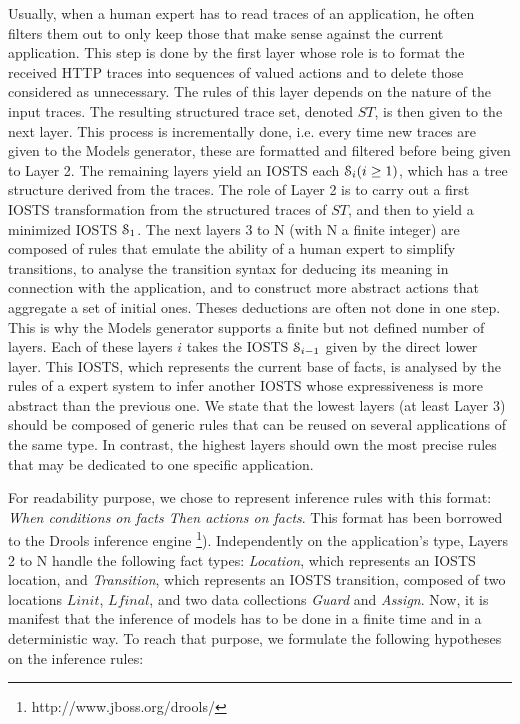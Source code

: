 Usually, when a human expert has to read traces of an
application, he often filters them out to only keep those that
make sense against the current application. This step is done by
the first layer whose role is to format the received HTTP traces
into sequences of valued actions and to delete those considered
as unnecessary. The rules of this layer depends on the nature of
the input traces. The resulting structured trace set, denoted
$ST$, is then given to the next layer. This process is
incrementally done, i.e. every time new traces are given to the
Models generator, these are formatted and filtered before being
given to Layer 2. The remaining layers yield an IOSTS each
$\EuScript{S}_i (i\geq 1)$, which has a tree structure derived
from the traces. The role of Layer 2 is to carry out a first
IOSTS transformation from the structured traces of $ST$, and then
to yield a minimized IOSTS $\EuScript{S}_1$. The next layers
3 to N (with N a finite integer) are composed of rules that
emulate the ability of a human expert to simplify transitions, to
analyse the transition syntax for deducing its meaning in
connection with the application, and to construct more abstract
actions that aggregate a set of initial ones. Theses deductions
are often not done in one step. This is why the Models generator
supports a finite but not defined number of layers.  Each of
these layers $i$ takes the IOSTS $\EuScript{S}_{i-1}$ given by
the direct lower layer. This IOSTS, which represents the current
base of facts, is analysed by the rules of a expert system to
infer another IOSTS whose expressiveness is more abstract than
the previous one. We state that the lowest layers (at least Layer
3) should be composed of generic rules that can be reused on
several applications of the same type. In contrast, the highest
layers should own the most precise rules that may be dedicated to
one specific application.

For readability purpose, we chose to represent inference rules
with this format: \textit{When conditions on facts Then actions on
facts}. This format has been borrowed to the Drools inference
engine \footnote{http://www.jboss.org/drools/}). Independently
on the application's type, Layers 2 to N handle the following
fact types: \textit{Location}, which represents an IOSTS location,
and \textit{Transition}, which represents an IOSTS transition,
composed of two locations $Linit$, $Lfinal$, and two data
collections \textit{Guard} and \textit{Assign}. Now, it is
manifest that the inference of models has to be done in a finite
time and in a deterministic way. To reach that purpose, we
formulate the following hypotheses on the inference rules:

